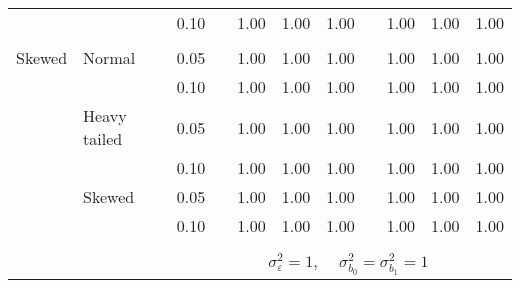 \begin{table}[ht]
\begin{scriptsize}
\begin{center}
\begin{tabular}{ll p{.1cm} c p{.1cm} rrr p{.1cm} rrr}
             &              && 0.10 &&  1.00 & 1.00 & 1.00 && 1.00 & 1.00 & 1.00 \\ 
             &&&&&&&&&&&\\
Skewed       & Normal       && 0.05 &&  1.00 & 1.00 & 1.00 && 1.00 & 1.00 & 1.00 \\ 
             &              && 0.10 &&  1.00 & 1.00 & 1.00 && 1.00 & 1.00 & 1.00 \\ 
             & Heavy tailed && 0.05 &&  1.00 & 1.00 & 1.00 && 1.00 & 1.00 & 1.00 \\ 
             &              && 0.10 &&  1.00 & 1.00 & 1.00 && 1.00 & 1.00 & 1.00 \\ 
             & Skewed       && 0.05 &&  1.00 & 1.00 & 1.00 && 1.00 & 1.00 & 1.00 \\ 
             &              && 0.10 &&  1.00 & 1.00 & 1.00 && 1.00 & 1.00 & 1.00 \\ 

&&&&&&&&&&&\\
& && && \multicolumn{6}{c}{$\sigma_{\varepsilon}^2 = 1$, \ \ $\sigma_{b_0}^2 = \sigma_{b_1}^2 = 1$} \\ \cline{6-12}


\end{tabular}
\end{center}
\end{scriptsize}
\end{table}

